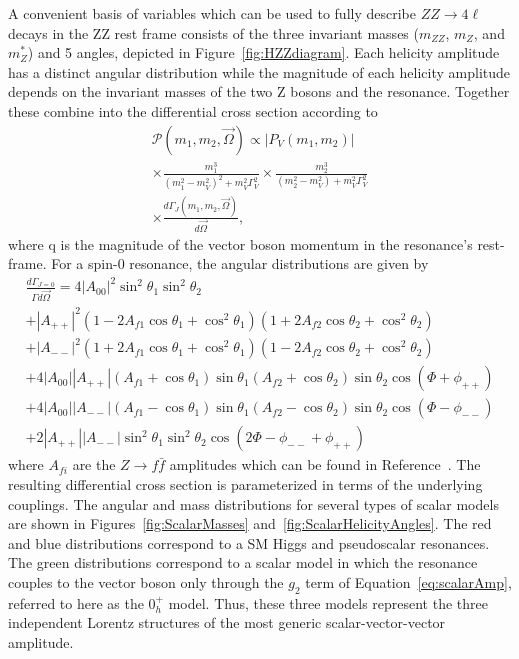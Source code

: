 A convenient basis of variables which can be
used to fully describe $ZZ\to4\ell$ decays in the ZZ rest frame 
consists of the three invariant masses ($m_{ZZ}$, $m_Z$, and 
$m_Z^*$) and 5 angles, depicted in Figure~\ref{fig:HZZdiagram}.
Each helicity amplitude has a distinct angular distribution while
the magnitude of each helicity amplitude depends on the invariant
masses of the two Z bosons and the resonance.  Together these 
combine into the differential cross section according to
\begin{equation}
\begin{split}
\mathscr{P}(m_1,m_2,\vec{\Omega})\propto|P_V(m_1,m_2)|  \\
\times\frac{m_1^3}{(m_1^2-m_V^2)^2+m_V^2\Gamma_V^2}\times\frac{m_2^3}{(m_2^2-m_V^2)+m_V^2\Gamma_V^2} \\
\times\frac{d\Gamma_J(m_1,m_2,\vec{\Omega})}{d\vec{\Omega}},
\end{split}
\end{equation}
where q is the magnitude of the vector boson momentum in the resonance's rest-frame.
For a spin-0 resonance, the angular distributions are given 
by
\begin{equation}
\begin{split}
\frac{d\Gamma_{J=0}}{\Gamma d\vec{\Omega}} = 4|A_{00}|^2\sin^2\theta_1\sin^2\theta_2 \\
+|A_{++}|^2(1-2A_{f1}\cos\theta_1+\cos^2\theta_1)(1+2A_{f2}\cos\theta_2+\cos^2\theta_2)\\
+|A_{--}|^2(1+2A_{f1}\cos\theta_1+\cos^2\theta_1)(1-2A_{f2}\cos\theta_2+\cos^2\theta_2)  \\
+4|A_{00}||A_{++}|(A_{f1}+\cos\theta_1)\sin\theta_1(A_{f2}+\cos\theta_2)\sin\theta_2\cos(\Phi+\phi_{++}) \\
+4|A_{00}||A_{--}|(A_{f1}-\cos\theta_1)\sin\theta_1(A_{f2}-\cos\theta_2)\sin\theta_2\cos(\Phi-\phi_{--}) \\
+2|A_{++}||A_{--}|\sin^2\theta_1\sin^2\theta_2\cos(2\Phi-\phi_{--}+\phi_{++})
\end{split}
\label{eq:angularDist}
\end{equation}
where $A_{fi}$ are the $Z\to f\bar{f}$ amplitudes which can be
found in Reference~\cite{Bolognesi:2012mm}.
The resulting differential cross section is parameterized in terms of 
the underlying couplings. 
The angular and mass distributions for several types of scalar 
models are shown in Figures~\ref{fig:ScalarMasses} 
and~\ref{fig:ScalarHelicityAngles}.  The red and blue distributions
correspond to a SM Higgs and pseudoscalar resonances.  The green 
distributions correspond to a scalar model in which the resonance couples
to the vector boson only through the $g_2$ term of 
Equation~\ref{eq:scalarAmp}, referred to here as
the $0_{h}^+$ model.  Thus, these three models 
represent the three independent Lorentz structures of the most generic
scalar-vector-vector amplitude.  

